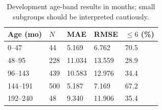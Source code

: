 \begin{table}[!t]
\centering\footnotesize
\caption{Development age-band results in months; small subgroups should be interpreted cautiously.}
\label{tab:prelim_age}
\begin{tabularx}{\columnwidth}{@{}p{27mm}XXXX@{}}
\toprule
Age (mo) & $N$ & MAE & RMSE & $\leq6$ (\%) \\
\midrule
0--47 & 44 & 5.169 & 6.762 & 70.5 \\
48--95 & 228 & 11.034 & 13.559 & 28.9 \\
96--143 & 439 & 10.583 & 12.976 & 34.4 \\
144--191 & 500 & 5.187 & 7.169 & 67.2 \\
192--240 & 48 & 9.340 & 11.906 & 35.4 \\
\bottomrule
\end{tabularx}
\end{table}
